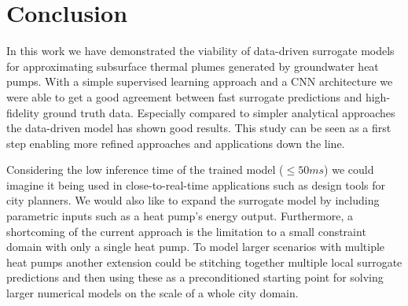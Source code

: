 \documentclass{article} %
\begin{document}


\section{Conclusion}
\label{sec:conclusion}

In this work we have demonstrated the viability of data-driven surrogate models for approximating subsurface thermal plumes generated by groundwater heat pumps.
With a simple supervised learning approach and a CNN architecture we were able to get a good agreement between fast surrogate predictions and high-fidelity ground truth data.
Especially compared to simpler analytical approaches the data-driven model has shown good results.
This study can be seen as a first step enabling more refined approaches and applications down the line.


Considering the low inference time of the trained model ($\leq 50ms$) we could imagine it being used in close-to-real-time applications such as design tools for city planners.
We would also like to expand the surrogate model by including parametric inputs such as a heat pump's energy output.
Furthermore, a shortcoming of the current approach is the limitation to a small constraint domain with only a single heat pump.
To model larger scenarios with multiple heat pumps another extension could be stitching together multiple local surrogate predictions and then using these as a preconditioned starting point for solving larger numerical models on the scale of a whole city domain.


% 
\end{document}
